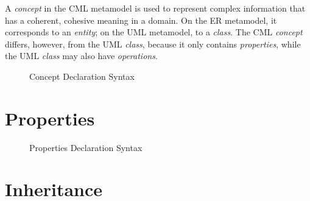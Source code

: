 A \emph{concept} in the CML metamodel is used
to represent complex information
that has a coherent, cohesive meaning in a domain.
On the ER \cite{er} metamodel,
it corresponds to an \emph{entity};
on the UML \cite{uml} metamodel,
to a \emph{class}.
The CML \emph{concept} differs, however, from the UML \emph{class},
because it only contains \emph{properties},
while the UML \emph{class} may also have \emph{operations}.

\begin{figure}
\verbatimfont{\small}
\begin{framed}

\end{framed}
\caption{Concept Declaration Syntax}
\label{fig:concept-syntax}
\end{figure}

\section{Properties}\label{sec:properties}

\begin{figure}
\verbatimfont{\small}
\begin{framed}

\end{framed}
\caption{Properties Declaration Syntax}
\label{fig:properties-syntax}
\end{figure}

\section{Inheritance}\label{sec:inheritance}
